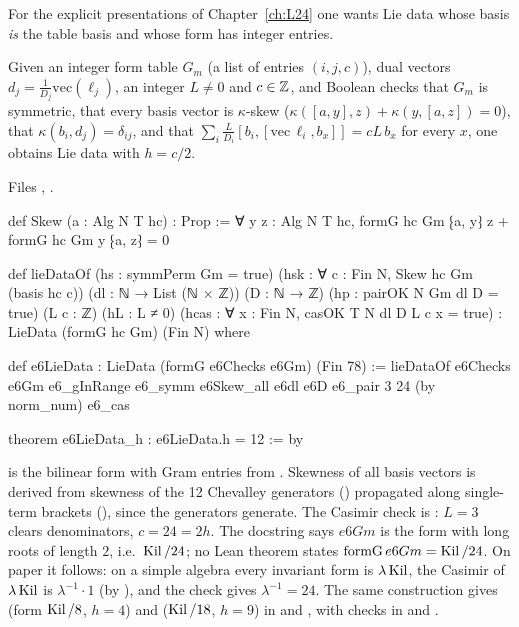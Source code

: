 For the explicit presentations of Chapter~\ref{ch:L24} one wants Lie data whose basis \emph{is} the table basis and whose form has integer entries.

\begin{definition}\label{l23:def:lieDataOf}
Given an integer form table $G_m$ (a list of entries $(i,j,c)$), dual vectors $d_j=\frac1{D_j}\mathrm{vec}(\ell_j)$, an integer $L\ne0$ and
$c\in{\mathbb{Z}}$, and Boolean checks that $G_m$ is symmetric, that every basis vector is $\kappa$-skew ($\kappa([a,y],z)+\kappa(y,[a,z])=0$), that
$\kappa(b_i,d_j)=\delta_{ij}$, and that $\sum_i\frac{L}{D_i}[b_i,[\mathrm{vec}\,\ell_i,b_x]]=cL\,b_x$ for every $x$, one obtains Lie data with
$h=c/2$.
\end{definition}
\noindent Files ,
.
\begin{leancode}
def Skew (a : Alg N T hc) : Prop :=
  ∀ y z : Alg N T hc, formG hc Gm ⁅a, y⁆ z + formG hc Gm y ⁅a, z⁆ = 0

def lieDataOf (hs : symmPerm Gm = true) (hsk : ∀ c : Fin N, Skew hc Gm (basis hc c))
    (dl : ℕ → List (ℕ × ℤ)) (D : ℕ → ℤ) (hp : pairOK N Gm dl D = true) (L c : ℤ) (hL : L ≠ 0)
    (hcas : ∀ x : Fin N, casOK T N dl D L c x = true) : LieData (formG hc Gm) (Fin N) where

def e6LieData : LieData (formG e6Checks e6Gm) (Fin 78) :=
  lieDataOf e6Checks e6Gm e6_gInRange e6_symm e6Skew_all e6dl e6D e6_pair 3 24 (by norm_num) e6_cas

theorem e6LieData_h : e6LieData.h = 12 := by
\end{leancode}

\begin{dictionary}
 is the bilinear form with Gram entries from . Skewness of all basis vectors is derived from skewness of the 12
Chevalley generators () propagated along single-term brackets (), since the generators generate.
The Casimir check is : $L=3$ clears denominators, $c=24=2h$. The docstring says $e6Gm$ is the form with long roots of length
$2$, i.e.\ $\operatorname{Kil}/24$; no Lean theorem states $\mathrm{formG}\,e6Gm=\operatorname{Kil}/24$. On paper it follows: on a simple algebra every invariant form
is $\lambda\operatorname{Kil}$, the Casimir of $\lambda\operatorname{Kil}$ is $\lambda^{-1}\cdot1$ (by ), and the check gives $\lambda^{-1}=24$. The same
construction gives  (form $\operatorname{Kil}/8$, $h=4$) and  ($\operatorname{Kil}/18$, $h=9$) in
 and , with checks in  and
.
\end{dictionary}

